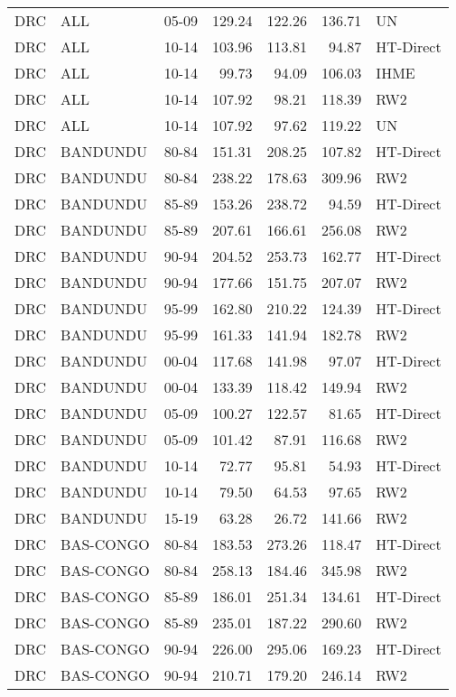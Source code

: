 \begin{longtable}{lllrrrl}
  DRC & ALL & 05-09 & 129.24 & 122.26 & 136.71 & UN \\ 
  DRC & ALL & 10-14 & 103.96 & 113.81 & 94.87 & HT-Direct \\ 
  DRC & ALL & 10-14 & 99.73 & 94.09 & 106.03 & IHME \\ 
  DRC & ALL & 10-14 & 107.92 & 98.21 & 118.39 & RW2 \\ 
  DRC & ALL & 10-14 & 107.92 & 97.62 & 119.22 & UN \\ 
  DRC & BANDUNDU & 80-84 & 151.31 & 208.25 & 107.82 & HT-Direct \\ 
  DRC & BANDUNDU & 80-84 & 238.22 & 178.63 & 309.96 & RW2 \\ 
  DRC & BANDUNDU & 85-89 & 153.26 & 238.72 & 94.59 & HT-Direct \\ 
  DRC & BANDUNDU & 85-89 & 207.61 & 166.61 & 256.08 & RW2 \\ 
  DRC & BANDUNDU & 90-94 & 204.52 & 253.73 & 162.77 & HT-Direct \\ 
  DRC & BANDUNDU & 90-94 & 177.66 & 151.75 & 207.07 & RW2 \\ 
  DRC & BANDUNDU & 95-99 & 162.80 & 210.22 & 124.39 & HT-Direct \\ 
  DRC & BANDUNDU & 95-99 & 161.33 & 141.94 & 182.78 & RW2 \\ 
  DRC & BANDUNDU & 00-04 & 117.68 & 141.98 & 97.07 & HT-Direct \\ 
  DRC & BANDUNDU & 00-04 & 133.39 & 118.42 & 149.94 & RW2 \\ 
  DRC & BANDUNDU & 05-09 & 100.27 & 122.57 & 81.65 & HT-Direct \\ 
  DRC & BANDUNDU & 05-09 & 101.42 & 87.91 & 116.68 & RW2 \\ 
  DRC & BANDUNDU & 10-14 & 72.77 & 95.81 & 54.93 & HT-Direct \\ 
  DRC & BANDUNDU & 10-14 & 79.50 & 64.53 & 97.65 & RW2 \\ 
  DRC & BANDUNDU & 15-19 & 63.28 & 26.72 & 141.66 & RW2 \\ 
  DRC & BAS-CONGO & 80-84 & 183.53 & 273.26 & 118.47 & HT-Direct \\ 
  DRC & BAS-CONGO & 80-84 & 258.13 & 184.46 & 345.98 & RW2 \\ 
  DRC & BAS-CONGO & 85-89 & 186.01 & 251.34 & 134.61 & HT-Direct \\ 
  DRC & BAS-CONGO & 85-89 & 235.01 & 187.22 & 290.60 & RW2 \\ 
  DRC & BAS-CONGO & 90-94 & 226.00 & 295.06 & 169.23 & HT-Direct \\ 
  DRC & BAS-CONGO & 90-94 & 210.71 & 179.20 & 246.14 & RW2 \\ 

\end{longtable}
